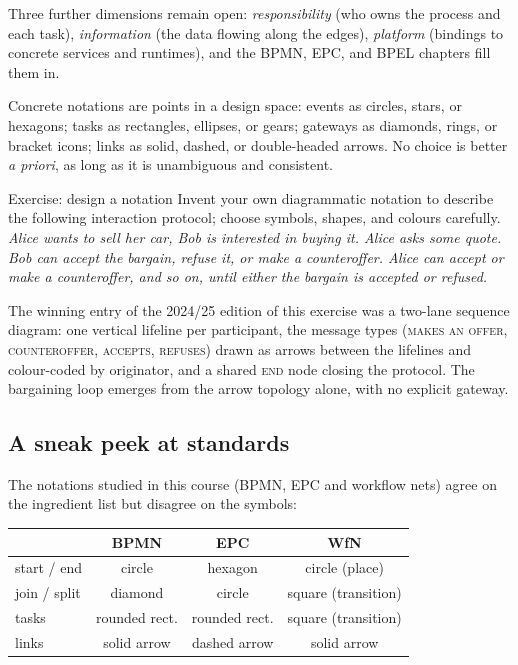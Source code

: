 Three further dimensions remain open: \emph{responsibility} (who owns the process and each task), \emph{information} (the data flowing along the edges), \emph{platform} (bindings to concrete services and runtimes), and the BPMN, EPC, and BPEL chapters fill them in.

Concrete notations are points in a design space: events as circles, stars, or hexagons; tasks as rectangles, ellipses, or gears; gateways as diamonds, rings, or bracket icons; links as solid, dashed, or double-headed arrows. No choice is better \emph{a priori}, as long as it is unambiguous and consistent.

\begin{examplebox}{Exercise: design a notation}
Invent your own diagrammatic notation to describe the following interaction protocol; choose symbols, shapes, and colours carefully. \textit{Alice wants to sell her car, Bob is interested in buying it. Alice asks some quote. Bob can accept the bargain, refuse it, or make a counteroffer. Alice can accept or make a counteroffer, and so on, until either the bargain is accepted or refused.}
\end{examplebox}

The winning entry of the 2024/25 edition of this exercise was a two-lane sequence diagram: one vertical lifeline per participant, the message types (\textsc{makes an offer}, \textsc{counteroffer}, \textsc{accepts}, \textsc{refuses}) drawn as arrows between the lifelines and colour-coded by originator, and a shared \textsc{end} node closing the protocol. The bargaining loop emerges from the arrow topology alone, with no explicit gateway.


\subsection{A sneak peek at standards}

The notations studied in this course (BPMN, EPC and workflow nets) agree on the ingredient list but disagree on the symbols:

\begin{center}
\begin{tabular}{lccc}
\toprule
 & \textbf{BPMN} & \textbf{EPC} & \textbf{WfN} \\
\midrule
start / end & circle & hexagon & circle (place) \\
join / split & diamond & circle & square (transition) \\
tasks       & rounded rect. & rounded rect. & square (transition) \\
links       & solid arrow & dashed arrow & solid arrow \\
\bottomrule
\end{tabular}
\end{center}

